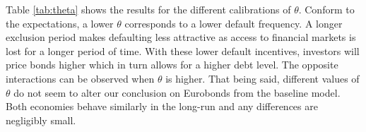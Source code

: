 Table \ref{tab:theta} shows the results for the different calibrations of $\theta$. Conform to the expectations, a lower $\theta$ corresponds to a lower default frequency. A longer exclusion period makes defaulting less attractive as access to financial markets is lost for a longer period of time. With these lower default incentives, investors will price bonds higher which in turn allows for a higher debt level. The opposite interactions can be observed when $\theta$ is higher. That being said, different values of $\theta$ do not seem to alter our conclusion on Eurobonds from the baseline model. Both economies behave similarly in the long-run and any differences are negligibly small.\\
\begin{table}[H]\Large
\setlength{\arrayrulewidth}{0.3mm}
\centering
    \caption{\textbf{Model statistics for different reentry probabilities $\theta$}}
    \label{tab:theta}
    \vspace{1mm}
\end{table}
